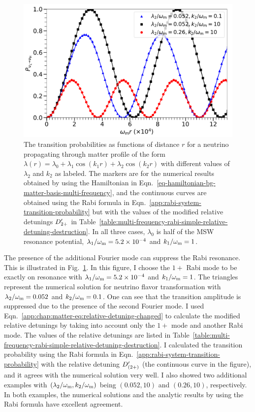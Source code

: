 \begin{figure}[!htbp]
    \centering
    \includegraphics[width=\columnwidth]{chapters/assets/matter/interference-reduction-slide-with-legend}
    \caption{The transition probabilities as functions of distance $r$ for a neutrino propagating through matter profile of the form $\lambda(r) = \lambda_0 + \lambda_1 \cos (k_1 r) + \lambda_2 \cos (k_2 r)$ with different values of $\lambda_2$ and $k_2$ as labeled. The markers are for the numerical results obtained by using the Hamiltonian in Eqn.~\eqref{eq-hamiltonian-bg-matter-basis-multi-frequency}, and the continuous curves are obtained using the Rabi formula in Eqn.~\eqref{app:rabi-system-transition-probability} but with the values of the modified relative detunings $D'_{2+}$ in Table~\ref{table:multi-frequency-rabi-simple-relative-detuning-destruction}. In all three cases, $\lambda_0$ is half of the MSW resonance potential, $\lambda_1/\omega_\mathrm m = 5.2\times 10^{-4}$ and $k_1/\omega_\mathrm m = 1$.}
    \label{fig-rabi-oscillations-energy-gap-change}
\end{figure}

The presence of the additional Fourier mode can suppress the Rabi resonance. This is illustrated in Fig.~\ref{fig-rabi-oscillations-energy-gap-change}. In this figure, I choose the $1+$ Rabi mode to be exactly on resonance with $\lambda_1/\omega_\mathrm m=5.2\times 10^{-4}$ and $k_1/\omega_\mathrm m=1$. The triangles represent the numerical solution for neutrino flavor transformation with $\lambda_2/\omega_\mathrm m=0.052$ and $k_2/\omega_\mathrm m=0.1$. One can see that the transition amplitude is suppressed due to the presence of the second Fourier mode. I used Eqn.~\eqref{app:chap:matter-eq:relative-detuning-changed} to calculate the modified relative detunings by taking into account only the $1+$ mode and another Rabi mode. The values of the relative detunings are listed in Table~\ref{table:multi-frequency-rabi-simple-relative-detuning-destruction}. I calculated the transition probability using the Rabi formula in Eqn.~\eqref{app:rabi-system-transition-probability} with the relative detuning $D'_{(2+)}$ (the continuous curve in the figure), and it agrees with the numerical solution very well. I also showed two additional examples with $(\lambda_2/\omega_\mathrm m, k_2/\omega_\mathrm m)$ being $(0.052, 10)$ and $(0.26, 10)$, respectively. In both examples, the numerical solutions and the analytic results by using the Rabi formula have excellent agreement.

